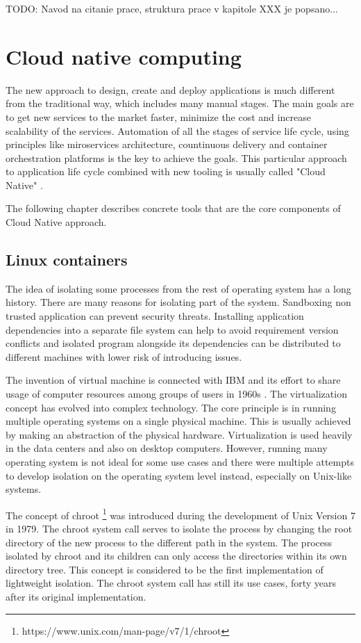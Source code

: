 \documentclass[
  digital, %
  twoside, %
  table,   %
  lof,     %
  lot,     %
]{fithesis3}
\begin{document}
TODO: Navod na citanie prace, struktura prace v kapitole XXX je popsano...

\chapter{Cloud native computing}
The new approach to design, create and deploy applications is much different from the traditional way, which includes many manual stages. The main goals are to get new services to the market faster, minimize the cost and increase scalability of the services. Automation of all the stages of service life cycle, using principles like miroservices architecture, countinuous delivery and container orchestration platforms is the key to achieve the goals. This particular approach to application life cycle combined with new tooling is usually called "Cloud Native" \cite{cloud_native}.

The following chapter describes concrete tools that are the core components of Cloud Native approach.

\section{Linux containers}
The idea of isolating some processes from the rest of operating system has a long history. There are many reasons for isolating part of the system. Sandboxing non trusted application can prevent security threats. Installing application dependencies into a separate file system can help to avoid requirement version conflicts and isolated program alongside its dependencies can be distributed to different machines with lower risk of introducing issues.

The invention of virtual machine is connected with IBM and its effort to share usage of computer resources among groups of users in 1960s \cite{vm_history}. The virtualization concept has evolved into complex technology. The core principle is in running multiple operating systems on a single physical machine. This is usually achieved by making an abstraction of the physical hardware. Virtualization is used heavily in the data centers and also on desktop computers. However, running many operating system is not ideal for some use cases and there were multiple attempts to develop isolation on the operating system level instead, especially on Unix-like systems.

The concept of chroot \footnote{https://www.unix.com/man-page/v7/1/chroot} was introduced during the development of Unix Version 7 in 1979. The chroot system call serves to isolate the process by changing the root directory of the new process to the different path in the system. The process isolated by chroot and its children can only access the directories within its own directory tree. This concept is considered to be the first implementation of lightweight isolation. The chroot system call has still its use cases, forty years after its original implementation.
\end{document}
